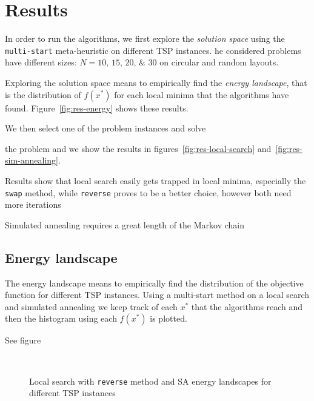 \section{Results}\label{subsc:res}

In order to run the algorithms, we first explore the \emph{solution space} using the \texttt{multi-start} meta-heuristic on different TSP instances. he considered problems have different sizes: $N=\numlist{10;15;20;30}$ on circular and random layouts.

Exploring the solution space means to empirically find the \emph{energy landscape}, that is the distribution of $f(x^\ast)$ for each local minima that the algorithms have found. Figure~\vref{fig:res-energy} shows these results.

We then select one of the problem instances and solve




the problem and we show the results in figures~\ref{fig:res-local-search} and~\vref{fig:res-sim-annealing}.

Results show that local search easily gets trapped in local minima, especially the \texttt{swap} method, while \texttt{reverse} proves to be a better choice, however both need more iterations

Simulated annealing requires a great length of the Markov chain


\subsection{Energy landscape}\label{subsc:energy-land}

The energy landscape means to empirically find the distribution of the objective function for different TSP instances. Using a multi-start method on a local search and simulated annealing we keep track of each $x^\ast$ that the algorithms reach and then the histogram using each $f(x^\ast)$ is plotted.

See figure



\begin{figure}
\centering
{} \,
\caption{Local search with \texttt{reverse} method and SA energy landscapes for different TSP instances}
\label{fig:res-energy}
\end{figure}



